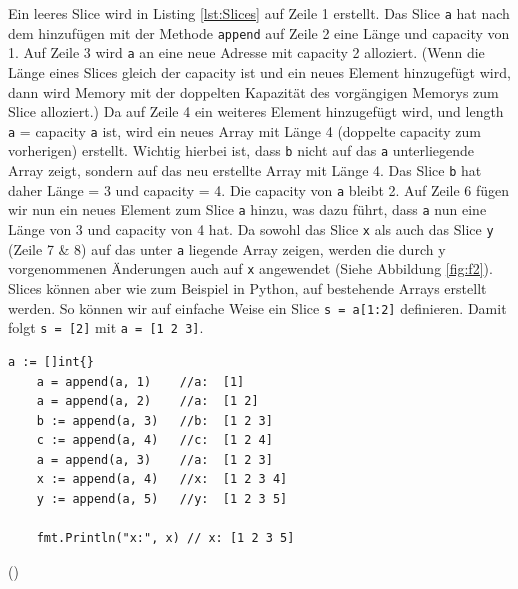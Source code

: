 \documentclass[11pt]{article}
\begin{document}
Ein leeres Slice wird in Listing \ref{lst:Slices} auf Zeile 1 erstellt. Das Slice \lstinline{a} hat nach dem hinzufügen mit der Methode \lstinline{append} auf Zeile 2 eine Länge und capacity von 1. Auf Zeile 3 wird \lstinline{a} an eine neue Adresse mit capacity 2 alloziert. (Wenn die Länge eines Slices gleich der capacity ist und ein neues Element hinzugefügt wird, dann wird Memory mit der doppelten Kapazität des vorgängigen Memorys zum Slice alloziert.) Da auf Zeile 4 ein weiteres Element hinzugefügt wird, und length \lstinline{a} = capacity \lstinline{a} ist, wird ein neues Array mit Länge 4 (doppelte capacity zum vorherigen) erstellt. Wichtig hierbei ist, dass \lstinline{b} nicht auf das \lstinline{a} unterliegende Array zeigt, sondern auf das neu erstellte Array mit Länge 4. Das Slice \lstinline{b} hat daher Länge = 3 und capacity = 4.  Die capacity von \lstinline{a} bleibt 2. Auf Zeile 6 fügen wir nun ein neues Element zum Slice \lstinline{a} hinzu, was dazu führt, dass \lstinline{a} nun eine Länge von 3 und capacity von 4 hat.
Da sowohl das Slice \lstinline{x} als auch das Slice \lstinline{y} (Zeile 7 \& 8) auf das unter \lstinline{a} liegende Array zeigen, werden die durch y vorgenommenen Änderungen auch auf \lstinline{x} angewendet (Siehe Abbildung \ref{fig:f2}).
Slices können aber wie zum Beispiel in Python, auf bestehende Arrays erstellt werden. So können wir auf einfache Weise ein Slice \lstinline|s = a[1:2]| definieren. Damit folgt \lstinline|s = [2]| mit \lstinline|a = [1 2 3]|.
\begin{lstlisting}[caption=Slices in Go, label=lst:Slices]
	a := []int{}
	a = append(a, 1)    //a:  [1] 
	a = append(a, 2)    //a:  [1 2]
	b := append(a, 3)   //b:  [1 2 3] 
	c := append(a, 4)   //c:  [1 2 4]
	a = append(a, 3)    //a:  [1 2 3]
	x := append(a, 4)   //x:  [1 2 3 4] 
	y := append(a, 5)   //y:  [1 2 3 5]
	
	fmt.Println("x:", x) // x: [1 2 3 5]
\end{lstlisting}
(\cite{Slices:medium})
\end{document}
